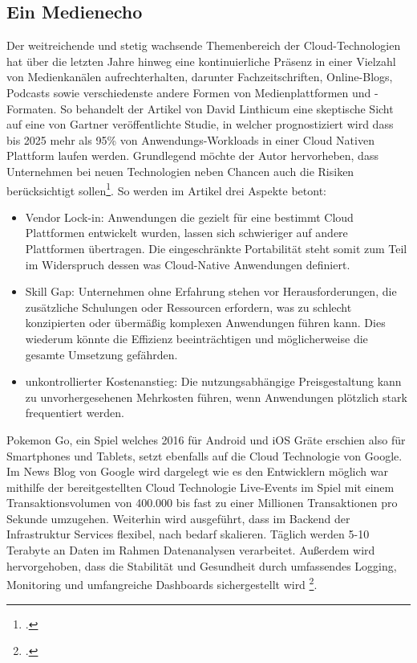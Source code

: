 \subsection{Ein Medienecho}\label{lab:medienecho}
Der weitreichende und stetig wachsende Themenbereich der Cloud-Technologien hat über die letzten Jahre hinweg eine kontinuierliche Präsenz in einer Vielzahl von Medienkanälen aufrechterhalten, darunter Fachzeitschriften, Online-Blogs, Podcasts sowie verschiedenste andere Formen von Medienplattformen und -Formaten. So behandelt der Artikel von David Linthicum eine skeptische Sicht auf eine von Gartner veröffentlichte Studie, in welcher prognostiziert wird dass bis 2025 mehr als 95\% von Anwendungs-Workloads in einer Cloud Nativen Plattform laufen werden. Grundlegend möchte der Autor hervorheben, dass Unternehmen bei neuen Technologien neben Chancen auch die Risiken berücksichtigt sollen\footcite[Vgl.][o.S.]{compWoche}. So werden im Artikel drei Aspekte betont:
\begin{itemize}
	\item Vendor Lock-in: Anwendungen die gezielt für eine bestimmt Cloud Plattformen entwickelt wurden, lassen sich schwieriger auf andere Plattformen übertragen. Die eingeschränkte Portabilität steht somit zum Teil im Widerspruch dessen was Cloud-Native Anwendungen definiert.
	\item Skill Gap: Unternehmen ohne Erfahrung stehen vor Herausforderungen, die zusätzliche Schulungen oder Ressourcen erfordern, was zu schlecht konzipierten oder übermäßig komplexen Anwendungen führen kann. Dies wiederum könnte die Effizienz beeinträchtigen und möglicherweise die gesamte Umsetzung gefährden.
	\item unkontrollierter Kostenanstieg: Die nutzungsabhängige Preisgestaltung kann zu unvorhergesehenen Mehrkosten führen, wenn Anwendungen plötzlich stark frequentiert werden. 
\end{itemize}

Pokemon Go, ein Spiel welches 2016 für Android und iOS Gräte erschien also für Smartphones und Tablets, setzt ebenfalls auf die Cloud Technologie von Google. Im News Blog von Google wird dargelegt wie es den Entwicklern möglich war mithilfe der bereitgestellten Cloud Technologie Live-Events im Spiel mit einem Transaktionsvolumen von 400.000 bis fast zu einer Millionen Transaktionen pro Sekunde umzugehen. Weiterhin wird ausgeführt, dass im Backend der Infrastruktur  Services flexibel, nach bedarf skalieren. Täglich werden 5-10 Terabyte an Daten im Rahmen Datenanalysen verarbeitet. Außerdem wird hervorgehoben, dass die Stabilität und Gesundheit durch umfassendes Logging, Monitoring und umfangreiche Dashboards sichergestellt wird \footcite[Vgl.][o.S.]{pokemonGo}.
